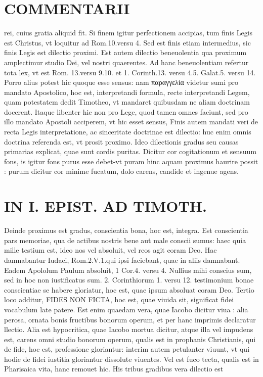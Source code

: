 \documentclass{article}
\begin{document}
\begin{pages}
\section*{COMMENTARII }
\marginpar{[ p.22 ]}\pstart rei, cuius gratia aliquid fit. Si finem igitur perfectionem accipias, tum finis Legis est Christus, vt loquitur ad Rom.10.versu 4. Sed est finis etiam intermedius, sic finis Legis est dilectio proximi. Est autem dilectio beneuolentia qua proximum amplectimur studio Dei, vel nostri quaerentes. Ad hanc beneuolentiam refertur tota lex, vt est Rom. 13.versu 9.10. et 1. Corinth.13. versu 4.5. Galat.5. versu 14. Porro alius potest hic quoque esse sensus: nam παραγγελία videtur sumi pro mandato Apostolico, hoc est, interpretandi formula, recte interpretandi Legem, quam potestatem dedit Timotheo, vt mandaret quibusdam ne aliam doctrinam docerent. Itaque libenter hic non pro Lege, quod tamen omnes faciunt, sed pro illo mandato Apostoli acciperem, vt hic esset sensus, Finis autem mandati veri de recta Legis interpretatione, ac sinceritate doctrinae est dilectio: huc enim omnis doctrina referenda est, vt prosit proximo. Ideo dilectionis gradus seu causas primarias explicat, quae sunt cordis puritas. Dicitur cor cogitationum et sensuum fons, is igitur fons purus esse debet-vt puram hinc aquam proximus haurire possit : purum dicitur cor minime fucatum, dolo carens, candide et ingenue agens.  \pend
\section*{IN I. EPIST. AD TIMOTH. }
\marginpar{[ p.23 ]}\pstart Deinde proximus est gradus, conscientia bona, hoc est, integra. Est conscientia pars memoriae, qua de actibus  nostris bene aut male conscii sumus: haec quia mille testium est, ideo nos vel absoluit, vel reos agit coram Deo. Hac damnabantur Iudaei, Rom.2.V.1.qui ipsi faciebant, quae in aliis damnabant. Eadem Apololum Paulum absoluit, 1 Cor.4. versu 4. Nullius mihi conscius sum, sed in hoc non iustificatus sum. 2. Corinthiorum 1. versu 12. testimonium bonae conscientiae se habere gloriatur, hoc est, quae ipsum absoluat coram Deo.  \pend\pstart Tertio loco additur, FIDES NON FICTA, hoc est, quae viuida sit, significat fidei vocabulum late patere. Est enim quaedam vera, quae Iacobo dicitur viua : alia perosa, ornata bonis fructibus bonorum operum, et per hanc imprimis declaratur llectio. Alia est hypocritica, quae Iacobo mortua dicitur, atque illa vel impudens est, carens omni studio bonorum operum, qualis est in prophanis Christianis, qui de fide, hoc est, professione gloriantur: interim autem petulanter viuunt, vt qui hodie de fidei iustitia gloriantur dissolute viuentes. Vel est fuco tecta, qualis est in Pharisaica vita, hanc remouet hic. His tribus gradibus vera dilectio est  \pend

\end{pages}
\end{document}
